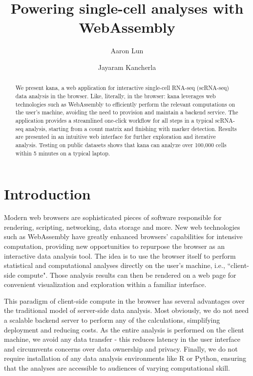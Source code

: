\documentclass{article}
\title{Powering single-cell analyses with WebAssembly}
\author[1]{Aaron Lun}
\affil[1]{Genentech, Inc. South San Francisco, CA}
\author[1]{Jayaram Kancherla}
\begin{document}
\maketitle

\newcommand{\pending}[1]{\textcolor{red}{#1}}

\begin{abstract}
We present kana, a web application for interactive single-cell RNA-seq (scRNA-seq) data analysis in the browser.
Like, literally, in the browser:
kana leverages web technologies such as WebAssembly to efficiently perform the relevant computations on the user's machine,
avoiding the need to provision and maintain a backend service. 
The application provides a streamlined one-click workflow for all steps in a typical scRNA-seq analysis, 
starting from a count matrix and finishing with marker detection.
Results are presented in an intuitive web interface for further exploration and iterative analysis. 
Testing on public datasets shows that kana can analyze over 100,000 cells within 5 minutes on a typical laptop.
\end{abstract}

\section{Introduction}

Modern web browsers are sophisticated pieces of software responsible for rendering, scripting, networking, data storage and more.
New web technologies such as WebAssembly \cite{haas2017bringing} have greatly enhanced browsers' capabilities for intensive computation,
providing new opportunities to repurpose the browser as an interactive data analysis tool.
The idea is to use the browser itself to perform statistical and computational analyses directly on the user's machine, i.e., ``client-side compute". 
Those analysis results can then be rendered on a web page for convenient visualization and exploration within a familiar interface.

This paradigm of client-side compute in the browser has several advantages over the traditional model of server-side data analysis.
Most obviously, we do not need a scalable backend server to perform any of the calculations, simplifying deployment and reducing costs.
As the entire analysis is performed on the client machine, we avoid any data transfer - this reduces latency in the user interface and circumvents concerns over data ownership and privacy.
Finally, we do not require installation of any data analysis environments like R or Python, ensuring that the analyses are accessible to audiences of varying computational skill.
\end{document}
